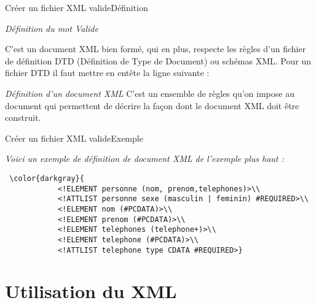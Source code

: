 \documentclass{beamer}
\begin{document}
\begin{frame}{Créer un fichier XML valide}{Définition}
\begin{block}{
  \textit{Définition du mot \textit{Valide}}
  }
  \begin{center}
  C'est un document XML bien formé, qui en plus, respecte les règles d'un fichier de définition DTD (Définition de Type de Document) ou schémas XML. Pour un fichier DTD il faut mettre en entête la ligne suivante :\\ 
  \color{gray}{
  \textless !DOCTYPE AML SYSTEM "nomfichier.dtd" \textgreater
  }
  \end{center}
 \end{block}
 \begin{block}
    { \textit{Définition d'un document XML}}
    C'est un ensemble de règles qu'on impose au document qui permettent de décrire la façon dont le document XML doit être construit.
 \end{block}
\end{frame}

\begin{frame}{Créer un fichier XML valide}{Exemple}
    \begin{block}
        {\textit{Voici un exemple de définition de document XML de l'exemple plus haut :}}
        \begin{verbatim} \color{darkgray}{
            <!ELEMENT personne (nom, prenom,telephones)>\\
            <!ATTLIST personne sexe (masculin | feminin) #REQUIRED>\\
            <!ELEMENT nom (#PCDATA)>\\
            <!ELEMENT prenom (#PCDATA)>\\
            <!ELEMENT telephones (telephone+)>\\
            <!ELEMENT telephone (#PCDATA)>\\
            <!ATTLIST telephone type CDATA #REQUIRED>}
        \end{verbatim}
    \end{block}
\end{frame}

\section{Utilisation du XML}
\end{document}
